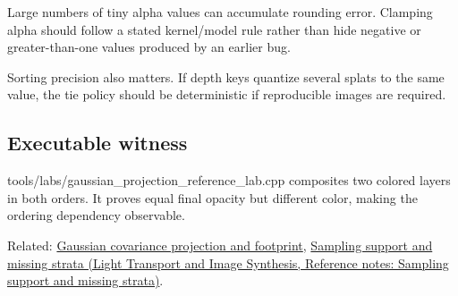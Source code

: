Large numbers of tiny alpha values can accumulate rounding error. Clamping alpha should follow a stated kernel/model rule rather than hide negative or greater-than-one values produced by an earlier bug.

Sorting precision also matters. If depth keys quantize several splats to the same value, the tie policy should be deterministic if reproducible images are required.

\subsection{Executable witness}\label{appendix-5f4b2e24c3f6-executable-witness}

\hypertarget{appendix-5f4b2e24c3f6-executable-witness}{}

tools/labs/gaussian\_projection\_reference\_lab.cpp composites two colored layers in both orders. It proves equal final opacity but different color, making the ordering dependency observable.

Related: \hyperref[appendix-24269cb6977c]{Gaussian covariance projection and footprint}, \href{../04-Light-Transport-and-Image-Synthesis/main.pdf\#nameddest=appendix-10308c3d753e}{Sampling support and missing strata (Light Transport and Image Synthesis, Reference notes: Sampling support and missing strata)}.
